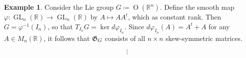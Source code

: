\documentclass[10pt,letterpaper,cm]{nupset}
\theoremstyle{definition}
\newtheorem{exmp}[defn]{Example}
\theoremstyle{theorem}
\theoremstyle{remark}
\newcommand{\G}{\frak{G}}
\newcommand{\R}{\mathbb{R}}
\newcommand{\1}{\mathbb{1}}
\newcommand{\0}{\vec 0}
\DeclareMathOperator{\GL}{GL}
\DeclareMathOperator{\Or}{O}
\begin{document}
\begin{exmp}
Consider the Lie group $G \coloneqq \Or(\R^n)$. Define the smooth map $\varphi : \GL_n(\R) \to \GL_n(\R)$ by $A\mapsto AA^t$, which as constant rank.  Then $G = \varphi^{-1}(I_n)$, so that $T_{I_n}{G} = \ker{d{\varphi}_{I_n}}$. Since $d{\varphi}_{I_n}(A) = A^t + A$ for any $A \in M_n(\R)$, it follows that $\G_G$ consists of all $n\times n$ skew-symmetric matrices. 
\end{exmp}

\[
\vdots
\]
\end{document}
